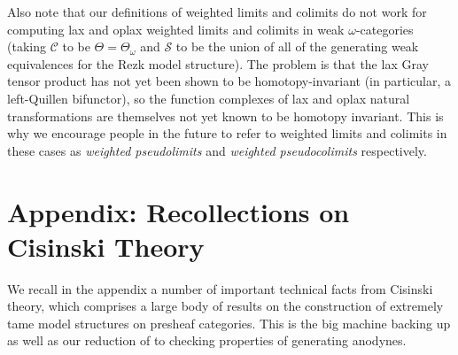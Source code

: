 \documentclass[a4paper]{article}
\numberwithin{equation}{subsection}
\theoremstyle{plain}   %
\theoremstyle{definition}
\theoremstyle{remark}
\theoremstyle{plain}
\providecommand{\C}{}
\renewcommand{\C}{\ensuremath{\mathcal{C}}}
\newcommand{\setS}{\ensuremath{\mathscr{S}}}
\begin{document}
Also note that our definitions of weighted limits and colimits do not work for computing lax and oplax weighted limits and colimits in weak \(\omega\)-categories (taking \(\C\) to be \(\Theta=\Theta_\omega\) and \(\setS\) to be the union of all of the generating weak equivalences for the Rezk model structure).  The problem is that the lax Gray tensor product has not yet been shown to be homotopy-invariant (in particular, a left-Quillen bifunctor), so the function complexes of lax and oplax natural transformations are themselves not yet known to be homotopy invariant.  This is why we encourage people in the future to refer to weighted limits and colimits in these cases as \emph{weighted pseudolimits} and \emph{weighted pseudocolimits} respectively.


\appendix
\section{Appendix: Recollections on Cisinski Theory}
We recall in the appendix a number of important technical facts from Cisinski theory, which comprises a large body of results on the construction of extremely tame model structures on presheaf categories.  This is the big machine backing up  as well as our reduction of  to checking properties of generating anodynes.
\end{document}

